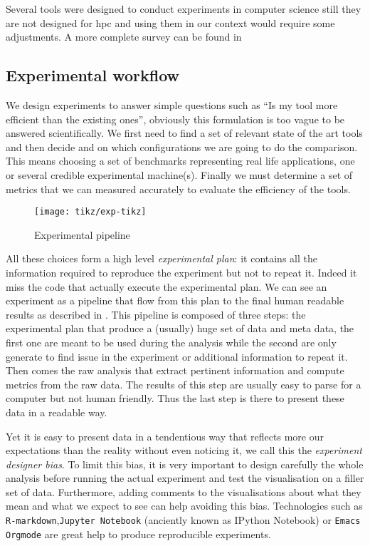 Several tools were designed to conduct experiments in computer science still
they are not designed for \gls{hpc} and using them in our context would
require some adjustments. A more complete survey can be found
in~\cite[Chapter~3, p17-19]{Stanisic15Reproducible}

\subsection{Experimental workflow}

We design experiments to answer simple questions such as ``Is my tool more
efficient than the existing ones'', obviously this formulation is too vague to
be answered scientifically. We first need to find a set of relevant state of
the art tools and then decide and on which configurations we are going to do
the comparison. This means choosing a set of benchmarks representing real life
applications, one or several credible experimental machine(s). Finally we must
determine a set of metrics that we can measured accurately to evaluate the
efficiency of the tools.

\begin{figure}[htb]
    \centering
    \texttt{[image: tikz/exp-tikz]}
    \caption{Experimental pipeline}
    \label{fig:exp-pipeline}
\end{figure}

All these choices form a high level \emph{experimental plan}: it contains all
the information required to reproduce the experiment but not to repeat it.
Indeed it miss the code that actually execute the experimental plan.
We can see an experiment as a pipeline that flow from this plan to the final
human readable results as described in . This pipeline is
composed of three steps: the experimental plan that produce a (usually) huge
set of data and meta data, the first one are meant to be used during the
analysis while the second are only generate to find issue in the experiment or
additional information to repeat it. Then comes the raw analysis that extract
pertinent information and compute metrics from the raw data. The results of
this step are usually easy to parse for a computer but not human friendly.
Thus the last step is there to present these data in a readable way.

Yet it is easy to present data in a tendentious way that reflects more our
expectations than the reality without even noticing it, we call this the
\emph{experiment designer bias}. To limit this bias,
it is very important to design carefully the whole analysis before running the
actual experiment and test the visualisation on a filler set of data.
Furthermore, adding comments to the visualisations about what they mean and
what we expect to see can help avoiding this bias. Technologies such as
\texttt{R-markdown},\texttt{Jupyter Notebook} (anciently known as IPython
Notebook) or \texttt{Emacs Orgmode} are great help to produce reproducible
experiments.

